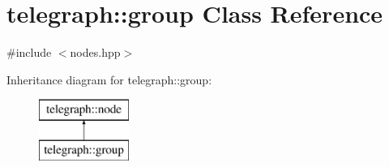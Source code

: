 \hypertarget{classtelegraph_1_1group}{}\section{telegraph\+:\+:group Class Reference}
\label{classtelegraph_1_1group}


{\ttfamily \#include $<$nodes.\+hpp$>$}

Inheritance diagram for telegraph\+:\+:group\+:\begin{figure}[H]
\begin{center}
\leavevmode
\includegraphics[height=2.000000cm]{classtelegraph_1_1group}
\end{center}
\end{figure}
